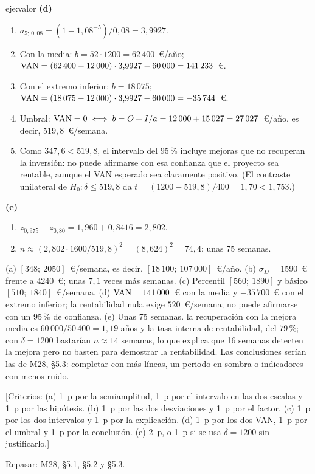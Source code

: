\begin{solucion}{eje:valor}
\noindent\textbf{(d)}
\begin{enumerate}[label=\arabic*.]
  \item $a_{5;\,0{,}08}=(1-1{,}08^{-5})/0{,}08=3{,}9927$.
  \item Con la media: $b=52\cdot 1200=62\,400$~€/año; $\mathrm{VAN}=(62\,400-12\,000)\cdot 3{,}9927-60\,000=141\,233$~€.
  \item Con el extremo inferior: $b=18\,075$; $\mathrm{VAN}=(18\,075-12\,000)\cdot 3{,}9927-60\,000=-35\,744$~€.
  \item Umbral: $\mathrm{VAN}=0\iff b=O+I/a=12\,000+15\,027=27\,027$~€/año, es decir, $519{,}8$~€/semana.
  \item Como $347{,}6<519{,}8$, el intervalo del 95\,\% incluye mejoras que no recuperan la inversión: no puede afirmarse con esa confianza que el proyecto sea rentable, aunque el VAN esperado sea claramente positivo. (El contraste unilateral de $H_0\colon\delta\le 519{,}8$ da $t=(1200-519{,}8)/400=1{,}70<1{,}753$.)
\end{enumerate}

\noindent\textbf{(e)}
\begin{enumerate}[label=\arabic*.]
  \item $z_{0{,}975}+z_{0{,}80}=1{,}960+0{,}8416=2{,}802$.
  \item $n\approx(2{,}802\cdot 1600/519{,}8)^{2}=(8{,}624)^{2}=74{,}4$: unas 75 semanas.
\end{enumerate}
\resultado (a) $[348;\ 2050]$~€/semana, es decir, $[18\,100;\ 107\,000]$~€/año. (b) $\sigma_D=1590$~€ frente a $4240$~€; unas $7{,}1$ veces más semanas. (c) Percentil $[560;\ 1890]$ y básico $[510;\ 1840]$~€/semana. (d) $\mathrm{VAN}=141\,000$~€ con la media y $-35\,700$~€ con el extremo inferior; la rentabilidad nula exige $520$~€/semana; no puede afirmarse con un 95\,\% de confianza. (e) Unas 75 semanas.
\comprobacion la recuperación con la mejora media es $60\,000/50\,400=1{,}19$ años y la tasa interna de rentabilidad, del $79\,\%$; con $\delta=1200$ bastarían $n\approx 14$ semanas, lo que explica que 16 semanas detecten la mejora pero no basten para demostrar la rentabilidad. Las conclusiones serían las de M28, §5.3: completar con más líneas, un periodo en sombra o indicadores con menos ruido.

[Criterios: (a) 1~p por la semiamplitud, 1~p por el intervalo en las dos escalas y 1~p por las hipótesis. (b) 1~p por las dos desviaciones y 1~p por el factor. (c) 1~p por los dos intervalos y 1~p por la explicación. (d) 1~p por los dos VAN, 1~p por el umbral y 1~p por la conclusión. (e) 2~p, o 1~p si se usa $\delta=1200$ sin justificarlo.]

Repasar: M28, §5.1, §5.2 y §5.3.
\end{solucion}
